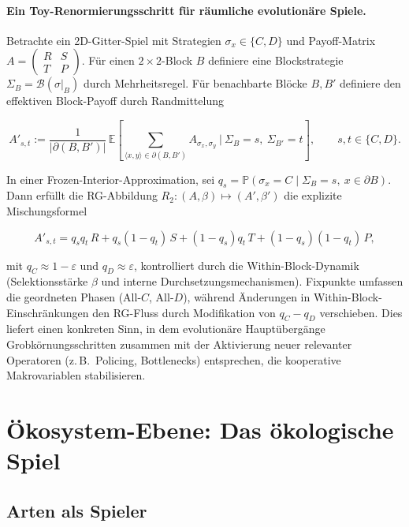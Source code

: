 \documentclass[12pt,a4paper]{article}
\theoremstyle{remark}
\begin{document}
\paragraph{Ein Toy-Renormierungsschritt f\"ur r\"aumliche evolution\"are Spiele.}
Betrachte ein 2D-Gitter-Spiel mit Strategien $\sigma_x\in\{C,D\}$ und Payoff-Matrix
$A=\begin{pmatrix}R&S\\ T&P\end{pmatrix}$.
F\"ur einen $2\times 2$-Block $B$ definiere eine Blockstrategie $\Sigma_B=\mathcal B(\sigma|_B)$ durch Mehrheitsregel.
F\"ur benachbarte Bl\"ocke $B,B'$ definiere den effektiven Block-Payoff durch Randmittelung

\[
A'_{s,t}
:=\frac{1}{|\partial(B,B')|}\,
\mathbb E\!\left[\sum_{\langle x,y\rangle\in\partial(B,B')} A_{\sigma_x,\sigma_y}\ \Big|\ \Sigma_B=s,\ \Sigma_{B'}=t\right],
\qquad s,t\in\{C,D\}.
\]

In einer Frozen-Interior-Approximation, sei
$q_s=\mathbb P(\sigma_x=C\mid \Sigma_B=s,\ x\in\partial B)$.
Dann erf\"ullt die RG-Abbildung $R_2:(A,\beta)\mapsto(A',\beta')$ die explizite Mischungsformel

\[
A'_{s,t}
= q_s q_t\,R + q_s(1-q_t)\,S + (1-q_s)q_t\,T + (1-q_s)(1-q_t)\,P,
\]

mit $q_C\approx 1-\varepsilon$ und $q_D\approx \varepsilon$, kontrolliert durch die Within-Block-Dynamik (Selektionsst\"arke $\beta$ und interne Durchsetzungsmechanismen).
Fixpunkte umfassen die geordneten Phasen (All-$C$, All-$D$), w\"ahrend \"Anderungen in Within-Block-Einschr\"ankungen den RG-Fluss durch Modifikation von $q_C-q_D$ verschieben.
Dies liefert einen konkreten Sinn, in dem evolution\"are Haupt\"uberg\"ange Grobk\"ornungsschritten zusammen mit der Aktivierung neuer relevanter Operatoren (z.\,B.\ Policing, Bottlenecks) entsprechen, die kooperative Makrovariablen stabilisieren.

\section{\"Okosystem-Ebene: Das \"okologische Spiel}
\label{sec:ecosystem}

\subsection{Arten als Spieler}
\end{document}
